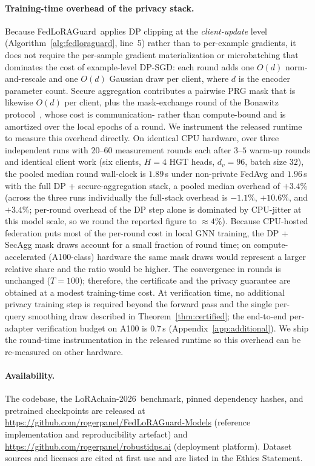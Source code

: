 \documentclass[11pt]{article}
\theoremstyle{plain}
\theoremstyle{definition}
\theoremstyle{remark}
\newcommand{\modelname}{FedLoRAGuard}
\newcommand{\benchname}{LoRAchain-2026}
\begin{document}
\paragraph{Training-time overhead of the privacy stack.}
Because \modelname\ applies DP clipping at the
\emph{client-update} level (Algorithm~\ref{alg:fedloraguard},
line~5) rather than to per-example gradients, it does not require
the per-sample gradient materialization or microbatching that
dominates the cost of example-level DP-SGD: each round adds one
$O(d)$ norm-and-rescale and one $O(d)$ Gaussian draw per client,
where $d$ is the encoder parameter count. Secure aggregation
contributes a pairwise PRG mask that is likewise $O(d)$ per
client, plus the mask-exchange round of the Bonawitz
protocol~\cite{bonawitz2017practical}, whose cost is
communication- rather than compute-bound and is amortized over the
local epochs of a round. We instrument the released runtime to
measure this overhead directly. On identical CPU hardware, over
three independent runs with $20$--$60$ measurement rounds each
after $3$--$5$ warm-up rounds and identical client work (six
clients, $H{=}4$ HGT heads, $d_v=96$, batch size $32$), the
pooled median round wall-clock is $1.89$\,s under non-private
FedAvg and $1.96$\,s with the full DP + secure-aggregation stack,
a pooled median overhead of $+3.4\%$ (across the three runs
individually the full-stack overhead is $-1.1\%$, $+10.6\%$, and
$+3.4\%$; per-round overhead of the DP step alone is dominated by
CPU-jitter at this model scale, so we round the reported figure
to $\approx 4\%$). Because CPU-hosted federation puts most of the
per-round cost in local GNN training, the DP + SecAgg mask draws
account for a small fraction of round time; on
compute-accelerated (A100-class) hardware the same mask draws
would represent a larger relative share and the ratio would be
higher. The convergence in rounds is unchanged ($T = 100$); therefore, the
certificate and the privacy guarantee are obtained at a
modest training-time cost.
At verification time, no additional privacy training step is
required beyond the forward pass and the single per-query
smoothing draw described in Theorem~\ref{thm:certified}; the
end-to-end per-adapter verification budget on A100 is $0.7$\,s
(Appendix~\ref{app:additional}). We ship the round-time
instrumentation in the released runtime so this overhead can be
re-measured on other hardware.

\paragraph{Availability.} The codebase, the \benchname\ benchmark,
pinned dependency hashes, and pretrained checkpoints are released
at \url{https://github.com/rogerpanel/FedLoRAGuard-Models}
(reference implementation and reproducibility artefact) and
\url{https://github.com/rogerpanel/robustidps.ai}
(deployment platform). Dataset sources and licenses are cited at
first use and are listed in the Ethics Statement.
\end{document}
